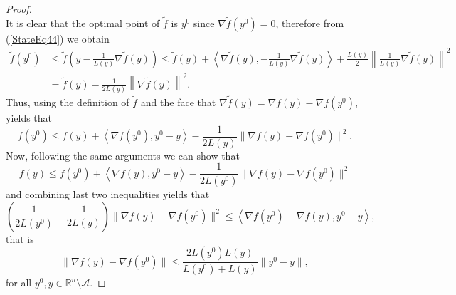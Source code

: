 \documentclass[11pt]{article}
\numberwithin{equation}{section}
\begin{document}
\begin{proof}
\begin{equation}
\end{equation}
It is clear that the optimal point of $\widetilde{f}$ is $y^0$ since $\nabla \widetilde{f}(y^0) = 0$, therefore from (\ref{StateEq44}) we obtain
\begin{equation*}
\begin{aligned}
	\widetilde{f}(y^0) &\leq \widetilde{f}\left( y - \frac{1}{L(y)} \nabla \widetilde{f}(y) \right) \leq \widetilde{f}(y) + \left\langle \nabla \widetilde{f}(y), - \frac{1}{L(y)} \nabla \widetilde{f}(y) \right\rangle + \frac{L(y)}{2} \left\lVert \frac{1}{L(y)} \nabla \widetilde{f}(y) \right\rVert ^2 \\
	&= \widetilde{f}(y) - \frac{1}{2 L(y)} \left\lVert \nabla \widetilde{f}(y) \right\rVert ^2.
\end{aligned}
\end{equation*}
Thus, using the definition of $\widetilde{f}$ and the face that $\nabla \widetilde{f}(y) = \nabla f(y) - \nabla f(y^0)$, yields that
\begin{equation*}
	f(y^0) \leq f(y) + \left\langle \nabla f(y^0), y^0 - y \right\rangle - \frac{1}{2 L(y)} \| \nabla f(y) - \nabla f(y^0) \|^2 .
\end{equation*}
Now, following the same arguments we can show that
\begin{equation*}
	f(y) \leq f(y^0) + \left\langle \nabla f(y), y^0 - y \right\rangle - \frac{1}{2 L(y^0)} \| \nabla f(y) - \nabla f(y^0) \|^2
\end{equation*}
and combining last two inequalities yields that
\begin{equation*}
	\left( \frac{1}{2 L(y^0)} + \frac{1}{2 L(y)} \right) \| \nabla f(y) - \nabla f(y^0) \|^2 \leq \left\langle \nabla f(y^0) - \nabla f(y), y^0 - y \right\rangle ,
\end{equation*}
that is 
\begin{equation*}
	\| \nabla f(y) - \nabla f(y^0) \| \leq \frac{2L(y^0)L(y)}{L(y^0) + L(y)} \|y^0 - y\| ,
\end{equation*}
for all $y^0,y \in \mathbb{R}^n \setminus \mathcal{A}$.
\end{proof}
\end{document}
